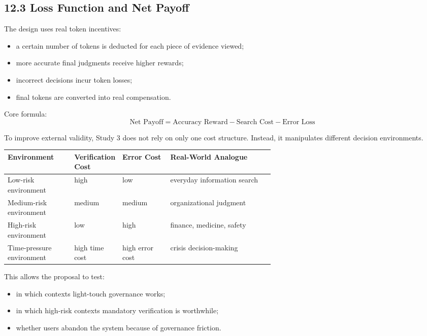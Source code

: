 \subsection*{12.3 Loss Function and Net Payoff}

The design uses real token incentives:
\begin{itemize}[leftmargin=1.5em]
\item a certain number of tokens is deducted for each piece of evidence viewed;
\item more accurate final judgments receive higher rewards;
\item incorrect decisions incur token losses;
\item final tokens are converted into real compensation.
\end{itemize}

Core formula:
\[
\text{Net Payoff} = \text{Accuracy Reward} - \text{Search Cost} - \text{Error Loss}
\]

To improve external validity, Study 3 does not rely on only one cost structure. Instead, it manipulates different decision environments.

\begin{center}
\begin{tabularx}{\linewidth}{>{\raggedright\arraybackslash}p{0.25\linewidth} >{\raggedright\arraybackslash}p{0.18\linewidth} >{\raggedright\arraybackslash}p{0.18\linewidth} >{\raggedright\arraybackslash}X}
\toprule
\textbf{Environment} & \textbf{Verification Cost} & \textbf{Error Cost} & \textbf{Real-World Analogue} \\
\midrule
Low-risk environment & high & low & everyday information search \\
Medium-risk environment & medium & medium & organizational judgment \\
High-risk environment & low & high & finance, medicine, safety \\
Time-pressure environment & high time cost & high error cost & crisis decision-making \\
\bottomrule
\end{tabularx}
\end{center}

This allows the proposal to test:
\begin{itemize}[leftmargin=1.5em]
\item in which contexts light-touch governance works;
\item in which high-risk contexts mandatory verification is worthwhile;
\item whether users abandon the system because of governance friction.
\end{itemize}

